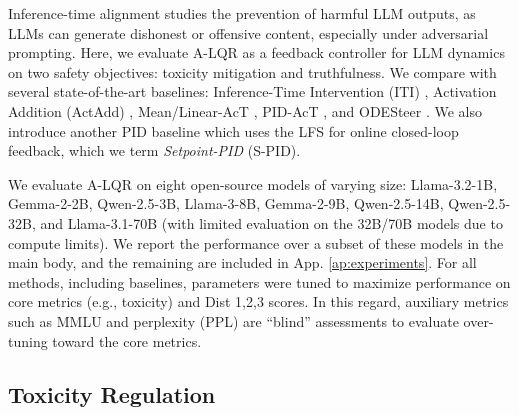 \documentclass{article}
\theoremstyle{plain}
\theoremstyle{definition}
\theoremstyle{remark}
\begin{document}
Inference-time alignment studies the prevention of harmful LLM outputs, as LLMs can generate dishonest or offensive content, especially under adversarial prompting. Here, we evaluate A-LQR as a feedback controller for LLM dynamics on two safety objectives: toxicity mitigation and truthfulness. 
We compare with several state-of-the-art baselines: Inference-Time Intervention (ITI) \cite{Li_Patel_Viégas_Pfister_Wattenberg_2024}, Activation Addition (ActAdd) \cite{turner2024activation}, Mean/Linear-AcT \cite{Rodriguez_Blaas_Klein_Zappella_Apostoloff_Cuturi_Suau_2024}, PID-AcT \cite{Nguyen_Vu_Pham_Zhang_Nguyen_2025}, and ODESteer \cite{ode_activation_steering}. We also introduce another PID baseline which uses the LFS for online closed-loop feedback, which we term \textit{Setpoint-PID} (S-PID). 

We evaluate A-LQR on eight open-source models of varying size: Llama-3.2-1B, Gemma-2-2B, Qwen-2.5-3B, Llama-3-8B, Gemma-2-9B, Qwen-2.5-14B, Qwen-2.5-32B, and Llama-3.1-70B \cite{llama8b,gemma_2024,qwen2.5} (with limited evaluation on the 32B/70B models due to compute limits). We report the performance over a subset of these models in the main body, and the remaining are included in App. \ref{ap:experiments}.
For all methods, including baselines, parameters were tuned to maximize performance on core metrics (e.g., toxicity) and Dist 1,2,3 scores. In this regard, auxiliary metrics such as MMLU and perplexity (PPL) are ``blind'' assessments to evaluate over-tuning toward the core metrics.



\vspace{-5pt}
\subsection{Toxicity Regulation}
\vspace{-5pt}
\end{document}
